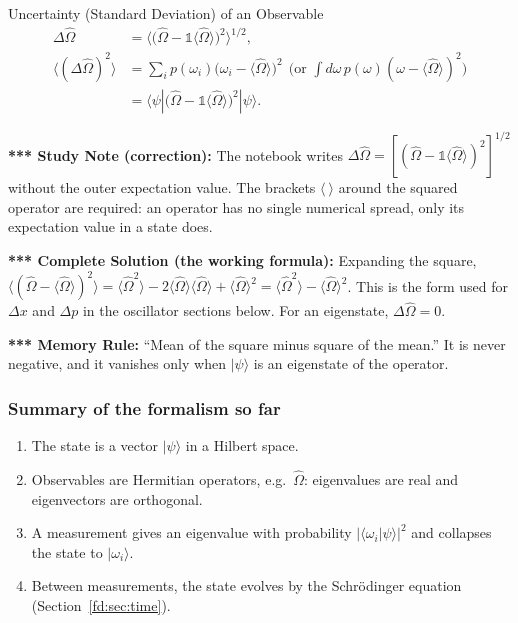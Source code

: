 \documentclass[11pt,a4paper]{article}
\begin{document}
\begin{thm}{Uncertainty (Standard Deviation) of an Observable}
\begin{align*}
\Delta\hat\Omega&=\Big\langle\big(\hat\Omega-\mathbb 1\langle\hat\Omega\rangle\big)^2\Big\rangle^{1/2},\\
\langle(\Delta\hat\Omega)^2\rangle&=\sum_ip(\omega_i)\big(\omega_i-\langle\hat\Omega\rangle\big)^2\ \ \Big(\text{or }\int d\omega\,p(\omega)(\omega-\langle\hat\Omega\rangle)^2\Big)\\
&=\langle\psi|\big(\hat\Omega-\mathbb 1\langle\hat\Omega\rangle\big)^2|\psi\rangle .
\end{align*}
\end{thm}
\textbf{*** Study Note (correction):} The notebook writes $\Delta\hat\Omega=[(\hat\Omega-\mathbb 1\langle\hat\Omega\rangle)^2]^{1/2}$ without the outer expectation value. The brackets $\langle\ \rangle$ around the squared operator are required: an operator has no single numerical spread, only its expectation value in a state does.

\textbf{*** Complete Solution (the working formula):} Expanding the square, $\langle(\hat\Omega-\langle\hat\Omega\rangle)^2\rangle=\langle\hat\Omega^2\rangle-2\langle\hat\Omega\rangle\langle\hat\Omega\rangle+\langle\hat\Omega\rangle^2=\langle\hat\Omega^2\rangle-\langle\hat\Omega\rangle^2$. This is the form used for $\Delta x$ and $\Delta p$ in the oscillator sections below. For an eigenstate, $\Delta\hat\Omega=0$.

\textbf{*** Memory Rule:} ``Mean of the square minus square of the mean.'' It is never negative, and it vanishes only when $|\psi\rangle$ is an eigenstate of the operator.

\subsubsection*{Summary of the formalism so far}
\begin{enumerate}[leftmargin=1.5em,itemsep=1pt]
\item The state is a vector $|\psi\rangle$ in a Hilbert space.
\item Observables are Hermitian operators, e.g.\ $\hat\Omega$: eigenvalues are real and eigenvectors are orthogonal.
\item A measurement gives an eigenvalue with probability $|\langle\omega_i|\psi\rangle|^2$ and collapses the state to $|\omega_i\rangle$.
\item Between measurements, the state evolves by the Schr\"odinger equation (Section~\ref{fd:sec:time}).
\end{enumerate}
\end{document}
